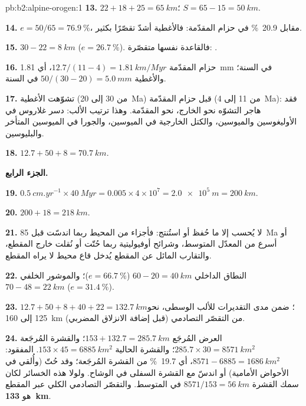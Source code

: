 \begin{solution}{pb:b2:alpine-orogen:1}
\textbf{13.} $22 + 18 + 25 = \qty{65}{km}$؛ $S = 65 - 15 = \qty{50}{km}$.

\textbf{14.} $e = 50/65 = \qty{76.9}{\percent}$، مقابل \qty{20.9}{\percent} في
حزام المقدّمة: فالأغطية أشدّ تقصّرًا بكثير.

\textbf{15.} $30 - 22 = \qty{8}{km}$ ($e = \qty{26.7}{\percent}$). فالقاعدة نفسها
متقصّرة: .

\textbf{16.} حزام المقدّمة $12.7/(11 - 4) = \qty{1.81}{km/Myr}$، أي
\qty{1.81}{mm} في السنة؛ والأغطية $50/(30 - 20) = \qty{5.0}{mm}$ في السنة.

\textbf{17.} تشوّهت الأغطية (من 30 إلى \qty{20}{Ma}) قبل حزام المقدّمة (من 11 إلى
\qty{4}{Ma}): فقد هاجر التشوّه نحو الخارج، نحو المقدّمة. وهذا ترتيب
الألب: دسر غلاروس في الأوليغوسين والميوسين، والكتل الخارجية في الميوسين،
والجورا في الميوسين المتأخر والبليوسين.

\textbf{18.} $12.7 + 50 + 8 = \qty{70.7}{km}$.

\noindent\textbf{الجزء الرابع.}

\textbf{19.} $\qty{0.5}{cm.yr^{-1}}\times\qty{40}{Myr} = 0.005\times4\times10^7 =
\qty{2.0e5}{m} = \qty{200}{km}$.

\textbf{20.} $200 + 18 = \qty{218}{km}$.

\textbf{21.} لا يُحسب إلا ما حُفظ أو استُنتج: فأجزاء من المحيط ربما
اندسّت قبل \qty{85}{Ma} أو أسرع من المعدّل المتوسط، وشرائح أوفيوليتية ربما
حُتّت أو نُقلت خارج المقطع، والتقارب المائل عن المقطع يُدخل
قاع محيط لا يراه المقطع.

\textbf{22.} النطاق الداخلي $60 - 20 = \qty{40}{km}$ ($e = \qty{66.7}{\percent}$)؛ والموشور الخلفي
$70 - 48 = \qty{22}{km}$ ($e = \qty{31.4}{\percent}$).

\textbf{23.} $12.7 + 50 + 8 + 40 + 22 = \qty{132.7}{km}$؛ ضمن مدى التقديرات
للألب الوسطى، نحو 125 إلى \qty{160}{km} من التقصّر التصادمي (قبل إضافة
الانزلاق المضربي).

\textbf{24.} العرض المُرجَع $153 + 132.7 = \qty{285.7}{km}$؛ والقشرة المُرجَعة
$285.7\times30 = \qty{8571}{km^2}$؛ والقشرة الحالية $153\times45 = \qty{6885}{km^2}$. المفقود:
$8571 - 6885 = \qty{1686}{km^2}$، أي \qty{19.7}{\percent} من القشرة المُرجَعة؛ وقد
حُتّ (وأُلقي في الأحواض الأمامية) أو اندسّ مع القشرة السفلى في
الوشاح. ولولا هذه الخسائر لكان سمك القشرة $8571/153 = \qty{56}{km}$ في المتوسط.
والتقصّر التصادمي الكلي عبر المقطع هو
\textbf{\qty[text-series-to-math=true]{133}{km}}.
\end{solution}
